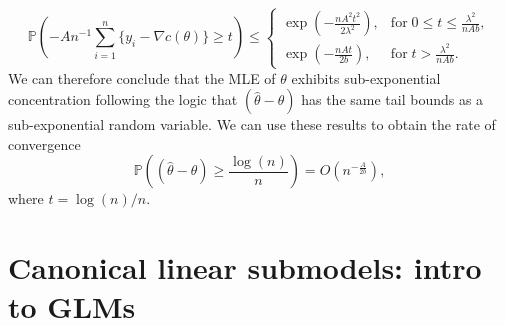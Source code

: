 \documentclass[12pt]{article}
\newcommand{\Prob}{\mathbb{P}}
\begin{document}
$$
  \Prob\left( -An^{-1}\sum_{i=1}^n\{y_i - \nabla c(\theta)\} \geq t\right) 
    \leq 
\left\{\begin{array}{cl}
    \exp\left(-\frac{nA^2t^2}{2\lambda^2}\right), & \text{for} \; 0 \leq t \leq \frac{\lambda^2}{nAb}, \\
    \exp\left(-\frac{nAt}{2b}\right), & \text{for} \; t > \frac{\lambda^2}{nAb}.
\end{array}	
\right.
$$
We can therefore conclude that the MLE of $\theta$ exhibits sub-exponential concentration following the logic that $(\hat\theta - \theta)$ has the same tail bounds as a sub-exponential random variable. We can use these results to obtain the rate of convergence
$$
  \Prob\left( (\hat\theta - \theta) \geq \frac{\log(n)}{n}\right) 
    = O\left(n^{-\frac{A}{2b}}\right),
$$
where $t = \log(n)/n$.



\section*{Canonical linear submodels: intro to GLMs}
\end{document}
